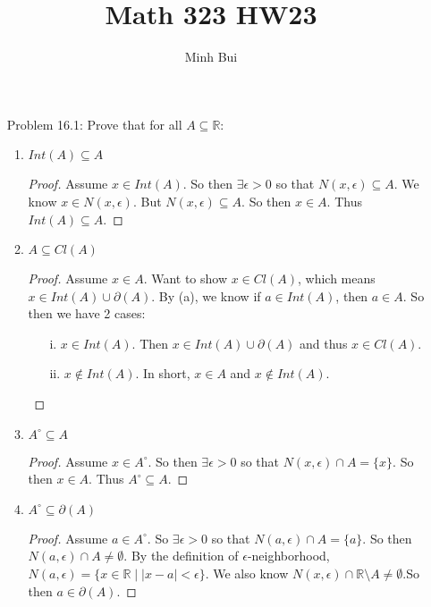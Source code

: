 \documentclass{article}
\author{Minh Bui}
\title{Math 323 HW23}
\theoremstyle{claim}
\theoremstyle{definition}
\begin{document}
\maketitle
\begin{enumerate}
    \item[Problem 16.1:] Prove that for all $A \subseteq \mathbb{R}$:
        \begin{enumerate}
            \item $Int(A) \subseteq A$
                \begin{proof}
                    Assume $x \in Int(A)$. So then $\exists \epsilon > 0$ so that $N(x, \epsilon) \subseteq A$. We know $x \in N(x, \epsilon)$. But $N(x, \epsilon) \subseteq A$. So then $x \in A$. Thus $Int(A) \subseteq A$.
                \end{proof}
            \item $A \subseteq Cl(A)$
                \begin{proof}
                    Assume $x \in A$. Want to show $x \in Cl(A)$, which means $x \in Int(A) \cup \partial(A)$. By (a), we know if $a \in Int(A)$, then $a \in A$. So then we have 2 cases:
                    \begin{enumerate}
                        \item[i.] $x \in Int(A)$. Then $x \in Int(A) \cup \partial(A)$ and thus $x \in Cl(A)$.
                        \item[ii.] $x \notin Int(A)$. In short, $x \in A$ and $x \notin Int(A)$.
                    \end{enumerate}
                \end{proof}
            \item $A^{\circ} \subseteq A$
                \begin{proof}
                    Assume $x \in A^{\circ}$. So then $\exists \epsilon > 0$ so that $N(x, \epsilon) \cap A = \{x\}$. So then $x \in A$. Thus $A^{\circ} \subseteq A$.
                \end{proof}
            \item $A^{\circ} \subseteq \partial(A)$
                \begin{proof}
                    Assume $a \in A^{\circ}$. So $\exists \epsilon > 0$ so that $N(a, \epsilon) \cap A = \{ a \}$. So then $N(a, \epsilon) \cap A \ne \emptyset$. By the definition of $\epsilon$-neighborhood, $N(a, \epsilon) = \{ x \in \mathbb{R} \mid |x - a| < \epsilon \}$. We also know $N(x, \epsilon) \cap \mathbb{R} \setminus A \ne \emptyset$.So then $a \in \partial(A)$.

\end{proof}
\end{enumerate}
\end{enumerate}
\end{document}
